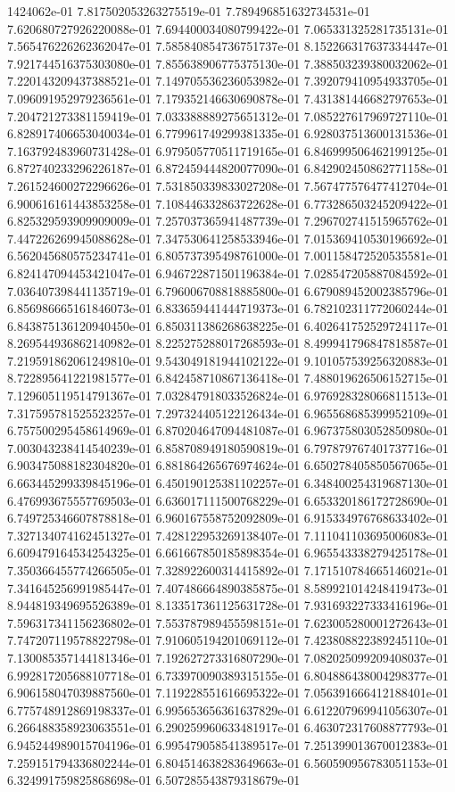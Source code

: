 1424062e-01	7.817502053263275519e-01	7.789496851632734531e-01	7.620680727926220088e-01	7.694400034080799422e-01	7.065331325281735131e-01	7.565476226262362047e-01	7.585840854736751737e-01	8.152266317637334447e-01	7.921744516375303080e-01	7.855638906775375130e-01	7.388503239380032062e-01	7.220143209437388521e-01	7.149705536236053982e-01	7.392079410954933705e-01	7.096091952979236561e-01	7.179352146630690878e-01	7.431381446682797653e-01	7.204721273381159419e-01	7.033388889275651312e-01	7.085227617969727110e-01	6.828917406653040034e-01	6.779961749299381335e-01	6.928037513600131536e-01	7.163792483960731428e-01	6.979505770511719165e-01	6.846999506462199125e-01	6.872740233296226187e-01	6.872459444820077090e-01	6.842902450862771158e-01	7.261524600272296626e-01	7.531850339833027208e-01	7.567477576477412704e-01	6.900616161443853258e-01	7.108446332863722628e-01	6.773286503245209422e-01	6.825329593909909009e-01	7.257037365941487739e-01	7.296702741515965762e-01	7.447226269945088628e-01	7.347530641258533946e-01	7.015369410530196692e-01	6.562045680575234741e-01	6.805737395498761000e-01	7.001158472520535581e-01	6.824147094453421047e-01	6.946722871501196384e-01	7.028547205887084592e-01	7.036407398441135719e-01	6.796006708818885800e-01	6.679089452002385796e-01	6.856986665161846073e-01	6.833659441444719373e-01	6.782102311772060244e-01	6.843875136120940450e-01	6.850311386268638225e-01	6.402641752529724117e-01	8.269544936862140982e-01	8.225275288017268593e-01	8.499941796847818587e-01	7.219591862061249810e-01	9.543049181944102122e-01	9.101057539256320883e-01	8.722895641221981577e-01	6.842458710867136418e-01	7.488019626506152715e-01	7.129605119514791367e-01	7.032847918033526824e-01	6.976928328066811513e-01	7.317595781525523257e-01	7.297324405122126434e-01	6.965568685399952109e-01	6.757500295458614969e-01	6.870204647094481087e-01	6.967375803052850980e-01	7.003043238414540239e-01	6.858708949180590819e-01	6.797879767401737716e-01	6.903475088182304820e-01	6.881864265676974624e-01	6.650278405850567065e-01	6.663445299339845196e-01	6.450190125381102257e-01	6.348400254319687130e-01	6.476993675557769503e-01	6.636017111500768229e-01	6.653320186172728690e-01	6.749725346607878818e-01	6.960167558752092809e-01	6.915334976768633402e-01	7.327134074162451327e-01	7.428122953269138407e-01	7.111041103695006083e-01	6.609479164534254325e-01	6.661667850185898354e-01	6.965543338279425178e-01	7.350366455774266505e-01	7.328922600314415892e-01	7.171510784665146021e-01	7.341645256991985447e-01	7.407486664890385875e-01	8.589921014248419473e-01	8.944819349695526389e-01	8.133517361125631728e-01	7.931693227333416196e-01	7.596317341156236802e-01	7.553787989455598151e-01	7.623005280001272643e-01	7.747207119578822798e-01	7.910605194201069112e-01	7.423808822389245110e-01	7.130085357144181346e-01	7.192627273316807290e-01	7.082025099209408037e-01	6.992817205688107718e-01	6.733970090389315155e-01	6.804886438004298377e-01	6.906158047039887560e-01	7.119228551616695322e-01	7.056391666412188401e-01	6.775748912869198337e-01	6.995653656361637829e-01	6.612207969941056307e-01	6.266488358923063551e-01	6.290259960633481917e-01	6.463072317608877793e-01	6.945244989015704196e-01	6.995479058541389517e-01	7.251399013670012383e-01	7.259151794336802244e-01	6.804514638283649663e-01	6.560590956783051153e-01	6.324991759825868698e-01	6.507285543879318679e-01